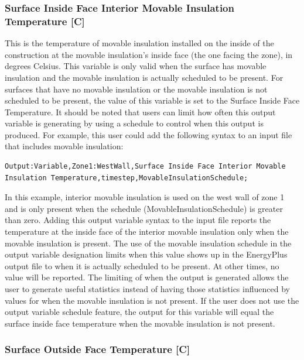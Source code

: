 \subsubsection{Surface Inside Face Interior Movable Insulation Temperature {[}C{]}}\label{surface-inside-face-interior-movable-insulation-temperature-c}

This is the temperature of movable insulation installed on the inside of the construction at the movable insulation's inside face (the one facing the zone), in degrees Celsius. This variable is only valid when the surface has movable insulation and the movable insulation is actually scheduled to be present.  For surfaces that have no movable insulation or the movable insulation is not scheduled to be present, the value of this variable is set to the Surface Inside Face Temperature.  It should be noted that users can limit how often this output variable is generating by using a schedule to control when this output is produced.  For example, this user could add the following syntax to an input file that includes movable insulation:

\begin{lstlisting}
Output:Variable,Zone1:WestWall,Surface Inside Face Interior Movable Insulation Temperature,timestep,MovableInsulationSchedule;
\end{lstlisting}

In this example, interior movable insulation is used on the west wall of zone 1 and is only present when the schedule (MovableInsulationSchedule) is greater than zero.  Adding this output variable syntax to the input file reports the temperature at the inside face of the interior movable insulation only when the movable insulation is present.  The use of the movable insulation schedule in the output variable designation limits when this value shows up in the EnergyPlus output file to when it is actually scheduled to be present.  At other times, no value will be reported.  The limiting of when the output is generated allows the user to generate useful statistics instead of having those statistics influenced by values for when the movable insulation is not present.  If the user does not use the output variable schedule feature, the output for this variable will equal the surface inside face temperature when the movable insulation is not present.

\subsubsection{Surface Outside Face Temperature {[}C{]}}\label{surface-outside-face-temperature-c}

